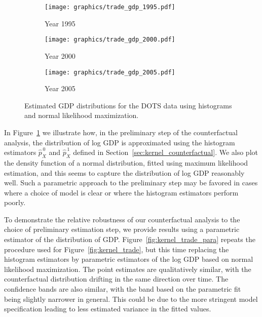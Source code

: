 \documentclass[11pt,lof]{puthesis}
\theoremstyle{break}
\theoremstyle{proof}
\begin{document}
\begin{figure}[b!]
\centering
%
\begin{subfigure}{0.32\textwidth}
\centering
\texttt{[image: graphics/trade\_gdp\_1995.pdf]}
\caption{Year 1995}
\end{subfigure}
%
\begin{subfigure}{0.32\textwidth}
\centering
\texttt{[image: graphics/trade\_gdp\_2000.pdf]}
\caption{Year 2000}
\end{subfigure}
%
\begin{subfigure}{0.32\textwidth}
\centering
\texttt{[image: graphics/trade\_gdp\_2005.pdf]}
\caption{Year 2005}
\end{subfigure}
%
\caption[Estimated GDP distributions for the DOTS data]{
Estimated GDP distributions for the DOTS data using histograms and
normal likelihood maximization.}
%
\label{fig:kernel_gdp}
%
\end{figure}

In Figure~\ref{fig:kernel_gdp} we illustrate how, in the preliminary step of the
counterfactual analysis, the distribution of log GDP is approximated using the
histogram estimators $\hat p_X^{\,0}$ and $\hat p_X^{\,1}$ defined in
Section~\ref{sec:kernel_counterfactual}. We also plot the density function of a
normal distribution, fitted using maximum likelihood estimation, and this seems
to capture the distribution of log GDP reasonably well. Such a parametric
approach to the preliminary step may be favored in cases where a choice of
model is clear or where the histogram estimators perform poorly.

To demonstrate the relative robustness of our counterfactual analysis to the
choice of preliminary estimation step, we provide results using a
parametric estimator of the distribution of GDP.
Figure~\ref{fig:kernel_trade_para}
repeats the procedure used for Figure~\ref{fig:kernel_trade}, but this time
replacing
the histogram estimators by parametric estimators of the log GDP based on
normal likelihood maximization. The point estimates are qualitatively similar,
with the counterfactual distribution drifting in the same direction over time.
The confidence bands are also similar, with the band based on the parametric
fit being slightly narrower in general. This could be due to the more stringent
model specification leading to less estimated variance in the fitted values.
\end{document}
